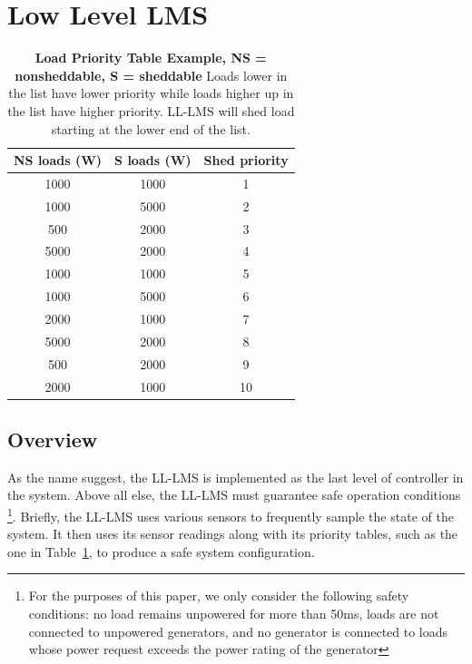 \documentclass{acm_proc_article-sp}
\begin{document}
\section{Low Level LMS}
\begin{table}[t]
\caption{\textbf{Load Priority Table Example, NS = nonsheddable, S = sheddable} 
Loads lower in the list have lower priority while loads higher up in the list have
higher priority. LL-LMS will shed load starting at the lower end of the list.}
\label{T:shed}
\centering
\begin{tabular}{c|cc}
 NS loads (W) & S loads (W) & Shed priority \\ \hline
1000 & 1000 & 1 \\
1000 & 5000 & 2 \\
500 & 2000 & 3 \\
5000 & 2000 & 4 \\
1000 & 1000 & 5 \\
1000 & 5000 & 6 \\
2000 & 1000 & 7 \\
5000 & 2000 & 8 \\
500 & 2000 & 9 \\
2000 & 1000 & 10 \\ \hline
\end{tabular}
\end{table}

\subsection{Overview}
As the name suggest, the LL-LMS is implemented as the last level of controller in the system. Above all else, the LL-LMS must guarantee safe operation
conditions \footnote{For the purposes of this paper, we only consider the following safety conditions: no load remains unpowered for more than 50ms,
loads are not connected to unpowered generators, and no generator is connected to loads whose power request exceeds the power rating of the generator}.
Briefly, the LL-LMS uses various sensors to frequently sample the state of the system. It then uses its sensor readings along with its
priority tables, such as the one in Table~\ref{T:shed}, to produce a safe system configuration.
\end{document}
